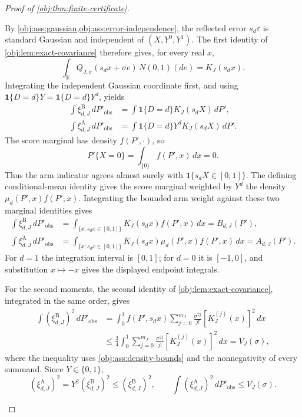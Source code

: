 \begin{proof}[Proof of \cref{obj:thm:finite-certificate}]
\begin{enumerate}
By \cref{obj:ass:gaussian,obj:ass:error-independence}, the reflected error \(s_d\varepsilon\) is standard Gaussian and independent of \((X,Y^0,Y^1)\). The first identity of \cref{obj:lem:exact-covariance} therefore gives, for every real \(x\),
\[
\int_{\mathbb R}Q_{J,\sigma}(s_dx+\sigma e)\,N(0,1)(de)
=K_J(s_dx).
\]
Integrating the independent Gaussian coordinate first, and using
\(\mathbf1\{D=d\}Y=\mathbf1\{D=d\}Y^d\), yields
\[
\begin{aligned}
\int \xi^{\mathrm B}_{d,J}\,dP'_{\mathrm{obs}}
&=\int \mathbf1\{D=d\}K_J(s_dX)\,dP',\\
\int \xi^{\mathrm A}_{d,J}\,dP'_{\mathrm{obs}}
&=\int \mathbf1\{D=d\}Y^dK_J(s_dX)\,dP'.
\end{aligned}
\]
The score marginal has density \(f(P',\cdot)\), so
\[
P'\{X=0\}=\int_{\{0\}}f(P',x)\,dx=0.
\]
Thus the arm indicator agrees almost surely with
\(\mathbf1\{s_dX\in[0,1]\}\). The defining conditional-mean identity gives the score marginal weighted by \(Y^d\) the density
\(\mu_d(P',x)f(P',x)\). Integrating the bounded arm weight against these two marginal identities gives
\[
\begin{aligned}
\int \xi^{\mathrm B}_{d,J}\,dP'_{\mathrm{obs}}
&=\int_{\{x:s_dx\in[0,1]\}}K_J(s_dx)f(P',x)\,dx
=B_{d,J}(P'),\\
\int \xi^{\mathrm A}_{d,J}\,dP'_{\mathrm{obs}}
&=\int_{\{x:s_dx\in[0,1]\}}
K_J(s_dx)\mu_d(P',x)f(P',x)\,dx
=A_{d,J}(P').
\end{aligned}
\]
For \(d=1\) the integration interval is \([0,1]\); for \(d=0\) it is \([-1,0]\), and substitution \(x\mapsto-x\) gives the displayed endpoint integrals.

For the second moments, the second identity of
\cref{obj:lem:exact-covariance}, integrated in the same order, gives
\[
\begin{aligned}
\int (\xi^{\mathrm B}_{d,J})^2\,dP'_{\mathrm{obs}}
&=\int_0^1 f(P',s_dx)
\sum_{j=0}^{m_J}\frac{\sigma^{2j}}{j!}
[K_J^{(j)}(x)]^2\,dx\\
&\le\frac34\int_0^1
\sum_{j=0}^{m_J}\frac{\sigma^{2j}}{j!}
[K_J^{(j)}(x)]^2\,dx
=V_J(\sigma),
\end{aligned}
\]
where the inequality uses \cref{obj:ass:density-bounds} and the nonnegativity of every summand. Since \(Y\in\{0,1\}\),
\[
(\xi^{\mathrm A}_{d,J})^2
=Y^2(\xi^{\mathrm B}_{d,J})^2
\le(\xi^{\mathrm B}_{d,J})^2,
\qquad
\int(\xi^{\mathrm A}_{d,J})^2\,dP'_{\mathrm{obs}}
\le V_J(\sigma).
\]


\end{enumerate}
\end{proof}
